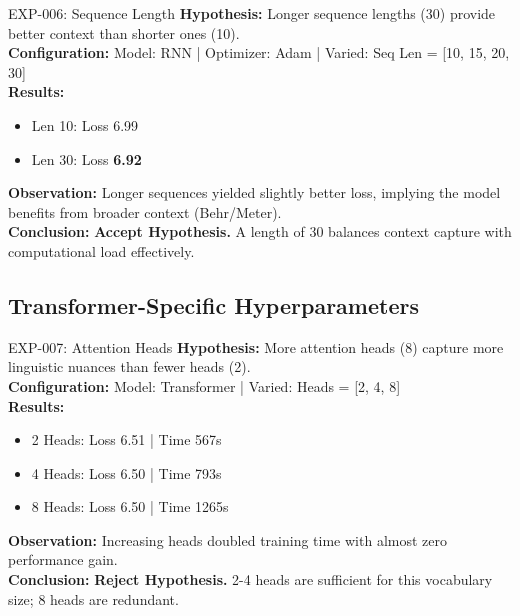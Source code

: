 \documentclass[12pt,a4paper]{article}
\begin{document}
\begin{experimentbox}{EXP-006: Sequence Length}
\textbf{Hypothesis:} Longer sequence lengths (30) provide better context than shorter ones (10). \\
\textbf{Configuration:} Model: RNN | Optimizer: Adam | Varied: Seq Len = [10, 15, 20, 30] \\
\textbf{Results:}
\begin{itemize}
    \item Len 10: Loss 6.99
    \item Len 30: Loss \textbf{6.92}
\end{itemize}
\textbf{Observation:} Longer sequences yielded slightly better loss, implying the model benefits from broader context (Behr/Meter). \\
\textbf{Conclusion:} \textbf{Accept Hypothesis.} A length of 30 balances context capture with computational load effectively.
\end{experimentbox}

\subsection{Transformer-Specific Hyperparameters}

\begin{experimentbox}{EXP-007: Attention Heads}
\textbf{Hypothesis:} More attention heads (8) capture more linguistic nuances than fewer heads (2). \\
\textbf{Configuration:} Model: Transformer | Varied: Heads = [2, 4, 8] \\
\textbf{Results:}
\begin{itemize}
    \item 2 Heads: Loss 6.51 | Time 567s
    \item 4 Heads: Loss 6.50 | Time 793s
    \item 8 Heads: Loss 6.50 | Time 1265s
\end{itemize}
\textbf{Observation:} Increasing heads doubled training time with almost zero performance gain. \\
\textbf{Conclusion:} \textbf{Reject Hypothesis.} 2-4 heads are sufficient for this vocabulary size; 8 heads are redundant.
\end{experimentbox}

\vspace{0.5cm}
\end{document}

